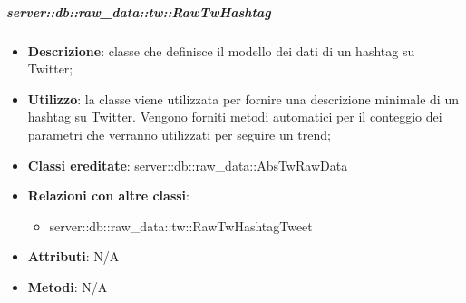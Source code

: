 		\subparagraph{server::db::raw\_data::tw::RawTwHashtag} %
		\label{subp:server_db_raw_data_tw_rawtwhashtag}
			\begin{itemize}
				\item \textbf{Descrizione}: classe che definisce il modello dei dati di un hashtag su Twitter;
				\item \textbf{Utilizzo}: la classe viene utilizzata per fornire una descrizione minimale di un hashtag su Twitter. Vengono forniti metodi automatici per il conteggio dei parametri che verranno utilizzati per seguire un trend;
				\item \textbf{Classi ereditate}: server::db::raw\_data::AbsTwRawData
				\item \textbf{Relazioni con altre classi}:
					\begin{itemize}
						\item server::db::raw\_data::tw::RawTwHashtagTweet
					\end{itemize}
				\item \textbf{Attributi}: N/A
				\item \textbf{Metodi}: N/A
			\end{itemize}


